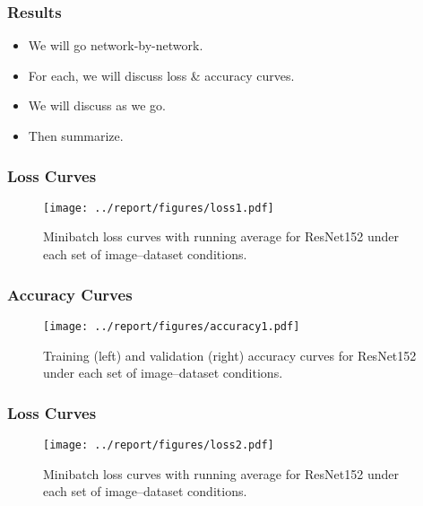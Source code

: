 \documentclass[11pt]{beamer}
\begin{document}
\begin{frame}
	\frametitle{Results}

	\begin{itemize}
	\item We will go network-by-network.
	\item For each, we will discuss loss \& accuracy curves.
	\item We will discuss as we go.
	\item Then summarize.
	\end{itemize}

\end{frame}

\begin{frame}
	\frametitle{Loss Curves}%

	\vspace{-0.75cm}
	\begin{figure}[btp]
	\begin{center}
	\texttt{[image: ../report/figures/loss1.pdf]}
	\end{center}
	\caption[caption]{Minibatch loss curves with running average for ResNet152 under each set of image--dataset conditions.}
	\label{fig:loss}
	\end{figure}

\end{frame}

\begin{frame}
	\frametitle{Accuracy Curves}%

	\vspace{-0.5cm}
	\begin{figure}[h]
	\begin{center}
	\texttt{[image: ../report/figures/accuracy1.pdf]}
	\end{center}
	\caption[caption]{Training (left) and validation (right) accuracy curves for ResNet152 under each set of image--dataset conditions.}
	\label{fig:acc}
	\end{figure}

\end{frame}


\begin{frame}
	\frametitle{Loss Curves}%

	\vspace{-0.75cm}
	\begin{figure}[btp]
	\begin{center}
	\texttt{[image: ../report/figures/loss2.pdf]}
	\end{center}
	\caption[caption]{Minibatch loss curves with running average for ResNet152 under each set of image--dataset conditions.}
	\label{fig:loss}
	\end{figure}

\end{frame}
\end{document}
